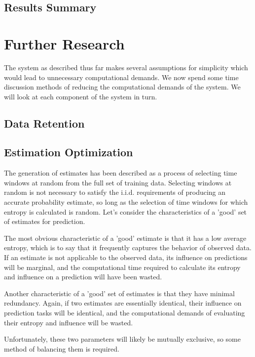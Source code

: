 \documentclass[10pt]{article}
\begin{document}
\subsection{Results Summary}


\section{Further Research}
The system as described thus far makes several assumptions for simplicity which would lead to unnecessary computational demands.  We now spend some time discussion methods of reducing the computational demands of the system.  We will look at each component of the system in turn.

\subsection{Data Retention}

\subsection{Estimation Optimization}
The generation of estimates has been described as a process of selecting time windows at random from the full set of training data.  Selecting windows at random is not necessary to satisfy the i.i.d. requirements of producing an accurate probability estimate, so long as the selection of time windows for which entropy is calculated is random.  Let's consider the characteristics of a 'good' set of estimates for prediction.  

The most obvious characteristic of a 'good' estimate is that it has a low average entropy, which is to say that it frequently captures the behavior of observed data.  If an estimate is not applicable to the observed data, its influence on predictions will be marginal, and the computational time required to calculate its entropy and influence on a prediction will have been wasted.  

Another characteristic of a 'good' set of estimates is that they have minimal redundancy.  Again, if two estimates are essentially identical, their influence on prediction tasks will be identical, and the computational demands of evaluating their entropy and influence will be wasted. 

Unfortunately, these two parameters will likely be mutually exclusive, so some method of balancing them is required.
\end{document}
